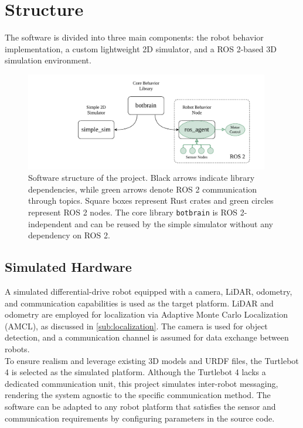 \section{Structure}
The software is divided into three main components: the robot behavior implementation, a custom lightweight 2D simulator, and a ROS 2-based 3D simulation environment.

\begin{figure}[H]
    \begin{center}
        \includegraphics[width=0.95\textwidth]{figures/software-structure.pdf}
    \end{center}
    \caption{Software structure of the project. Black arrows indicate library dependencies, while green arrows denote ROS 2 communication through topics. Square boxes represent Rust crates and green circles represent ROS 2 nodes. The core library \texttt{botbrain} is ROS 2-independent and can be reused by the simple simulator without any dependency on ROS 2.}
    \label{fig:software-structure}
\end{figure}

\subsection{Simulated Hardware}
A simulated differential-drive robot equipped with a camera, LiDAR, odometry, and communication capabilities is used as the target platform. LiDAR and odometry are employed for localization via Adaptive Monte Carlo Localization (AMCL), as discussed in \cref{sub:localization}. The camera is used for object detection, and a communication channel is assumed for data exchange between robots.\\

To ensure realism and leverage existing 3D models and URDF files, the Turtlebot 4 \cite{tb4} is selected as the simulated platform. Although the Turtlebot 4 lacks a dedicated communication unit, this project simulates inter-robot messaging, rendering the system agnostic to the specific communication method. The software can be adapted to any robot platform that satisfies the sensor and communication requirements by configuring parameters in the source code.

